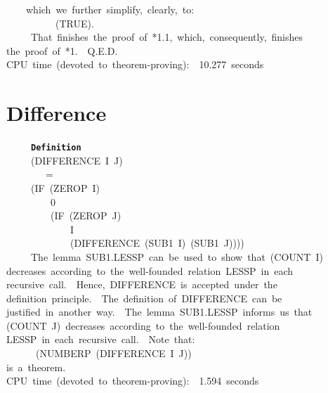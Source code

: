 \documentclass[11pt]{book}
\newenvironment{pubasis}{\begin{flushleft}\ttfamily\small}{\normalsize\rmfamily\end{flushleft}}
\newcommand{\axiomordefinition}[1]{\vspace{6pt}\texttt{\textbf{#1}}}
\newcommand{\pubdefaulttextsize}{\large}
\begin{document}
\begin{pubasis}
~~~~which~we~further~simplify,~clearly,~to:\\

~~~~~~~~~~(TRUE).\\

~~~~~That~finishes~the~proof~of~*1.1,~which,~consequently,~finishes\\
the~proof~of~*1.~~Q.E.D.\\

CPU~time~(devoted~to~theorem-proving):~~10.277~seconds\\
\end{pubasis}
\section{Difference}
\pubdefaulttextsize
\begin{pubasis}
~~~~~\axiomordefinition{Definition}\\
~~~~~(DIFFERENCE~I~J)\\
~~~~~~~~=\\
~~~~~(IF~(ZEROP~I)\\
~~~~~~~~~0\\
~~~~~~~~~(IF~(ZEROP~J)\\
~~~~~~~~~~~~~I\\
~~~~~~~~~~~~~(DIFFERENCE~(SUB1~I)~(SUB1~J))))\\

~~~~~The~lemma~SUB1.LESSP~can~be~used~to~show~that~(COUNT~I)\\
decreases~according~to~the~well-founded~relation~LESSP~in~each\\
recursive~call.~~Hence,~DIFFERENCE~is~accepted~under~the\\
definition~principle.~~The~definition~of~DIFFERENCE~can~be\\
justified~in~another~way.~~The~lemma~SUB1.LESSP~informs~us~that\\
(COUNT~J)~decreases~according~to~the~well-founded~relation\\
LESSP~in~each~recursive~call.~~Note~that:\\
~~~~~~(NUMBERP~(DIFFERENCE~I~J))\\
is~a~theorem.\\

CPU~time~(devoted~to~theorem-proving):~~1.594~seconds\\
\end{pubasis}
\end{document}

